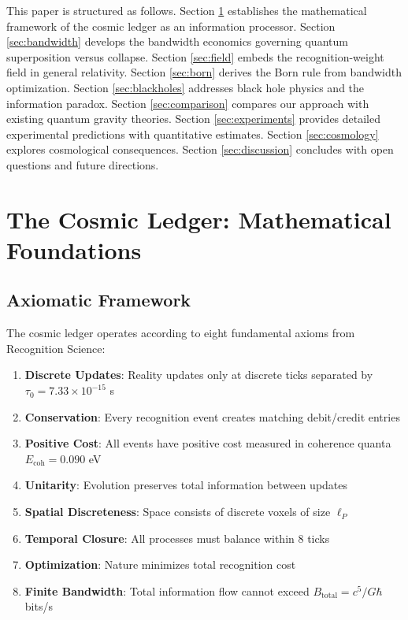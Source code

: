 \documentclass[twocolumn,prd,amsmath,amssymb,aps,superscriptaddress,nofootinbib]{revtex4-2}
\begin{document}
This paper is structured as follows. Section \ref{sec:ledger} establishes the mathematical framework of the cosmic ledger as an information processor. Section \ref{sec:bandwidth} develops the bandwidth economics governing quantum superposition versus collapse. Section \ref{sec:field} embeds the recognition-weight field in general relativity. Section \ref{sec:born} derives the Born rule from bandwidth optimization. Section \ref{sec:blackholes} addresses black hole physics and the information paradox. Section \ref{sec:comparison} compares our approach with existing quantum gravity theories. Section \ref{sec:experiments} provides detailed experimental predictions with quantitative estimates. Section \ref{sec:cosmology} explores cosmological consequences. Section \ref{sec:discussion} concludes with open questions and future directions.

\section{The Cosmic Ledger: Mathematical Foundations}
\label{sec:ledger}

\subsection{Axiomatic Framework}

The cosmic ledger operates according to eight fundamental axioms from Recognition Science:

\begin{enumerate}
\item \textbf{Discrete Updates}: Reality updates only at discrete ticks separated by $\tau_0 = 7.33 \times 10^{-15}$ s
\item \textbf{Conservation}: Every recognition event creates matching debit/credit entries  
\item \textbf{Positive Cost}: All events have positive cost measured in coherence quanta $E_{\text{coh}} = 0.090$ eV
\item \textbf{Unitarity}: Evolution preserves total information between updates
\item \textbf{Spatial Discreteness}: Space consists of discrete voxels of size $\ell_P$
\item \textbf{Temporal Closure}: All processes must balance within 8 ticks
\item \textbf{Optimization}: Nature minimizes total recognition cost
\item \textbf{Finite Bandwidth}: Total information flow cannot exceed $B_{\text{total}} = c^5/G\hbar$ bits/s
\end{enumerate}
\end{document}
